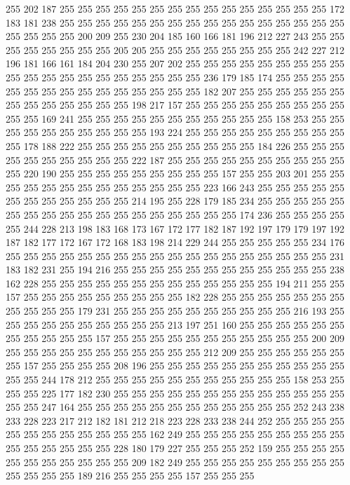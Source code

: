 255 202 187 255 255 255 255 255 255 255 255 255 255 255 255 255 255 255 172 183
181 238 255 255 255 255 255 255 255 255 255 255 255 255 255 255 255 255 255 255
255 255 200 209 255 230 204 185 160 166 181 196 212 227 243 255 255 255 255 255
255 255 255 205 205 255 255 255 255 255 255 255 255 242 227 212 196 181 166 161
184 204 230 255 207 202 255 255 255 255 255 255 255 255 255 255 255 255 255 255
255 255 255 255 255 255 236 179 185 174 255 255 255 255 255 255 255 255 255 255
255 255 255 255 255 182 207 255 255 255 255 255 255 255 255 255 255 255 255 255
198 217 157 255 255 255 255 255 255 255 255 255 255 255 169 241 255 255 255 255
255 255 255 255 255 255 255 158 253 255 255 255 255 255 255 255 255 255 255 193
224 255 255 255 255 255 255 255 255 255 255 178 188 222 255 255 255 255 255 255
255 255 255 255 184 226 255 255 255 255 255 255 255 255 255 255 222 187 255 255
255 255 255 255 255 255 255 255 255 220 190 255 255 255 255 255 255 255 255 255
157 255 255 203 201 255 255 255 255 255 255 255 255 255 255 255 255 255 223 166
243 255 255 255 255 255 255 255 255 255 255 255 255 214 195 255 228 179 185 234
255 255 255 255 255 255 255 255 255 255 255 255 255 255 255 255 255 255 174 236
255 255 255 255 255 244 228 213 198 183 168 173 167 172 177 182 187 192 197 179
179 197 192 187 182 177 172 167 172 168 183 198 214 229 244 255 255 255 255 255
234 176 255 255 255 255 255 255 255 255 255 255 255 255 255 255 255 255 255 255
231 183 182 231 255 194 216 255 255 255 255 255 255 255 255 255 255 255 255 238
162 228 255 255 255 255 255 255 255 255 255 255 255 255 255 194 211 255 255 157
255 255 255 255 255 255 255 255 255 182 228 255 255 255 255 255 255 255 255 255
255 255 179 231 255 255 255 255 255 255 255 255 255 255 216 193 255 255 255 255
255 255 255 255 255 255 213 197 251 160 255 255 255 255 255 255 255 255 255 255
255 157 255 255 255 255 255 255 255 255 255 255 255 200 209 255 255 255 255 255
255 255 255 255 255 255 212 209 255 255 255 255 255 255 255 157 255 255 255 255
208 196 255 255 255 255 255 255 255 255 255 255 255 255 255 244 178 212 255 255
255 255 255 255 255 255 255 255 255 158 253 255 255 255 225 177 182 230 255 255
255 255 255 255 255 255 255 255 255 255 255 255 255 247 164 255 255 255 255 255
255 255 255 255 255 255 255 252 243 238 233 228 223 217 212 182 181 212 218 223
228 233 238 244 252 255 255 255 255 255 255 255 255 255 255 255 255 162 249 255
255 255 255 255 255 255 255 255 255 255 255 255 255 255 228 180 179 227 255 255
255 252 159 255 255 255 255 255 255 255 255 255 255 255 209 182 249 255 255 255
255 255 255 255 255 255 255 255 255 255 189 216 255 255 255 255 157 255 255 255
